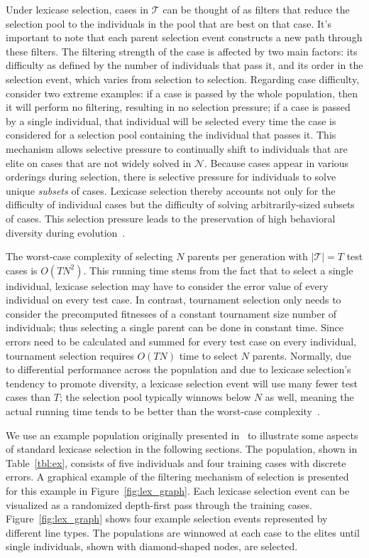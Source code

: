 \documentclass[twoside]{article}
\begin{document}
Under lexicase selection, cases in $\mathcal{T}$ can be thought of as filters that reduce the selection pool to the individuals in the pool that are best on that case. It's important to note that each parent selection event constructs a new path through these filters. The filtering strength of the case is affected by two main factors: its difficulty as defined by the number of individuals that pass it, and its order in the selection event, which varies from selection to selection. Regarding case difficulty, consider two extreme examples: if a case is passed by the whole population, then it will perform no filtering, resulting in no selection pressure; if a case is passed by a single individual, that individual will be selected every time the case is considered for a selection pool containing the individual that passes it. This mechanism allows selective pressure to continually shift to individuals that are elite on cases that are not widely solved in $\mathcal{N}$. Because cases appear in various orderings during selection, there is selective pressure for individuals to solve unique {\it subsets} of cases. Lexicase selection thereby accounts not only for the difficulty of individual cases but the difficulty of solving arbitrarily-sized subsets of cases. This selection pressure leads to the preservation of high behavioral diversity during evolution~\citep{Helmuth:2015:GPTP, la_cava_epsilon-lexicase_2016}. 

The worst-case complexity of selecting $N$ parents per generation with $|\mathcal{T}| = T$ test cases is $O(TN^2)$. This running time stems from the fact that to select a single individual, lexicase selection may have to consider the error value of every individual on every test case.
In contrast, tournament selection only needs to consider the precomputed fitnesses of a constant tournament size number of individuals; thus selecting a single parent can be done in constant time. Since errors need to be calculated and summed for every test case on every individual, tournament selection requires $O(TN)$ time to select $N$ parents.
Normally, due to differential performance across the population and due to lexicase selection's tendency to promote diversity, a lexicase selection event will use many fewer test cases than $T$; the selection pool typically winnows below $N$ as well, meaning the actual running time tends to be better than the worst-case complexity~\citep{helmuth_solving_2014, la_cava_epsilon-lexicase_2016}. 

We use an example population originally presented in~\citep{spector_assessment_2012} to illustrate some aspects of standard lexicase selection in the following sections. The population, shown in Table~\ref{tbl:ex}, consists of five individuals and four training cases with discrete errors. A graphical example of the filtering mechanism of selection is presented for this example in Figure~\ref{fig:lex_graph}. Each lexicase selection event can be visualized as a randomized depth-first pass through the training cases. Figure~\ref{fig:lex_graph} shows four example selection events represented by different line types. The populations are winnowed at each case to the elites until single individuals, shown with diamond-shaped nodes, are selected. 
\end{document}
